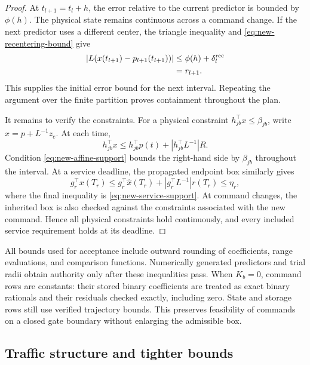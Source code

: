 \documentclass[preprint,12pt]{elsarticle}
\begin{document}
\begin{proof}
At $t_{l+1}=t_l+h$, the error relative to the current predictor is
bounded by $\phi(h)$. The physical state remains continuous across
a command change. If the next predictor uses a different center,
the triangle inequality and \eqref{eq:new-recentering-bound} give
\[
\begin{aligned}
 |L(x(t_{l+1})-p_{l+1}(t_{l+1}))|
 &\le \phi(h)+\delta_l^{\rm rec}\\
 &=r_{l+1}.
\end{aligned}
\]
This supplies the initial error bound for the next interval.
Repeating the argument over the finite partition proves
containment throughout the plan.

It remains to verify the constraints. For a physical constraint
$h_{jb}^{\top}x\le\beta_{jb}$, write $x=p+L^{-1}z_e$. At each time,
\[
 h_{jb}^{\top}x
 \le h_{jb}^{\top}p(t)+|h_{jb}^{\top}L^{-1}|R.
\]
Condition \eqref{eq:new-affine-support} bounds the right-hand side
by $\beta_{jb}$ throughout the interval. At a service deadline,
the propagated endpoint box similarly gives
\[
 g_r^{\top}x(T_r)
 \le g_r^{\top}\widehat x(T_r)
      +|g_r^{\top}L^{-1}|r(T_r)
 \le\eta_r,
\]
where the final inequality is
\eqref{eq:new-service-support}. At command changes, the inherited
box is also checked against the constraints associated with the
new command. Hence all physical constraints hold continuously,
and every included service requirement holds at its deadline.
\end{proof}


All bounds used for acceptance include outward rounding of coefficients,
range evaluations, and comparison functions. Numerically generated
predictors and trial radii obtain authority only after these inequalities
pass. When $K_b=0$, command rows are constants: their stored binary
coefficients are treated as exact binary rationals and their residuals
checked exactly, including zero. State and storage rows still use verified
trajectory bounds. This preserves feasibility of commands on a closed gate
boundary without enlarging the admissible box.

\subsection{Traffic structure and tighter bounds}
\label{sec:structure-certificate}
\label{app:structure-proof}
\end{document}
